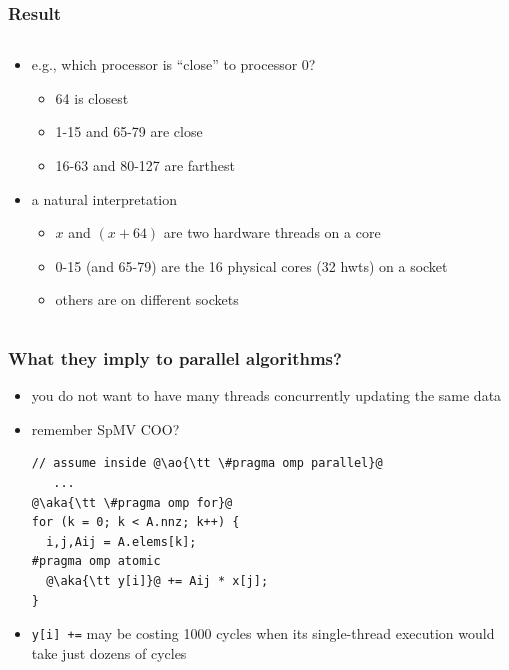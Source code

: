 \documentclass[12pt,dvipdfmx]{beamer}
\newcommand{\ao}[1]{{\color{blue}#1}}
\newcommand{\aka}[1]{{\color{red}#1}}
\begin{document}
\begin{frame}
\frametitle{Result}
\begin{columns}
\begin{column}{0.5\textwidth}
  \begin{itemize}
  \item e.g., which processor is ``close'' to processor $0$?
    \begin{itemize}
    \item 64 is closest
    \item 1-15 and 65-79 are close
    \item 16-63 and 80-127 are farthest
    \end{itemize}

  \item a natural interpretation
    \begin{itemize}
    \item $x$ and $(x+64)$ are two hardware threads on a core
    \item 0-15 (and 65-79) are the 16 physical cores (32 hwts)
      on a socket
    \item others are on different sockets
    \end{itemize}
    
  \end{itemize}
\end{column}
\begin{column}{0.5\textwidth}
\end{column}
\end{columns}
\end{frame}

\begin{frame}[fragile]
  \frametitle{What they imply to parallel algorithms?}
  \begin{itemize}
  \item you do not want to have many threads concurrently
    updating the same data
  \item remember SpMV COO?
\begin{lstlisting}
// assume inside @\ao{\tt \#pragma omp parallel}@
   ...
@\aka{\tt \#pragma omp for}@
for (k = 0; k < A.nnz; k++) {
  i,j,Aij = A.elems[k];
#pragma omp atomic  
  @\aka{\tt y[i]}@ += Aij * x[j];
}
\end{lstlisting}

\item {\aka{\tt y[i] +=}} may be costing
  1000 cycles when its single-thread execution
  would take just dozens of cycles
  \end{itemize}
\end{frame}
\end{document}
